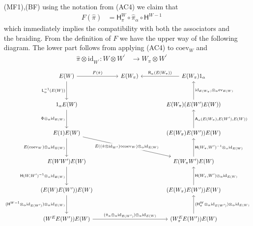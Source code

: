 \begin{prf}
\begin{enumerate}
\item[(MF1),(BF)]
using the notation from (AC4) we claim that
\begin{align*}
  F(\hat{\pi})
  &=
  \mathsf{H}_{\pi}^{W}
  \circ
  \hat{\pi}_{\alpha}
  \circ
  \mathsf{H}^{W -1}
\end{align*}
which immediately implies the compatibility with both the associators and the braiding.
\newpage
From the definition of $F$ we have the upper way of the following diagram. The lower part follows from applying (AC4) to $\mathrm{coev}_{W}$ and
\begin{align*}
  \hat{\pi} \otimes \mathrm{id}_{W^{\prime}}
  \colon
  W
  \otimes
  W^{\prime}
  &\to
  W_{\pi}
  \otimes
  W^{\prime}
\end{align*}
\begin{equation*}
\begin{tikzcd}[row sep=3.2em,column sep=4em]
  E(W)
  \ar{r}{F(\hat{\pi})}
  \ar{d}[swap]{\mathsf{L}_{\alpha}^{-1}(E(W))}
  &
  E(W_{\pi})
  &
  E(W_{\pi}) 1_{\alpha}
  \ar{l}[swap]{\mathsf{R}_{\alpha}(E(W_{\pi}))}
  \\
  1_{\alpha} E(W)
  \ar{d}[swap]{\Phi \otimes_{\alpha} \mathrm{id}_{E(W)}}
  &
  &
  E(W_{\pi}) (E(W^{\prime}) E(W))
  \ar{u}[swap]{\mathrm{id}_{E(W_{\pi})} \otimes_{\alpha} \mathrm{ev}_{E(W)}}
  \\
  E(1) E(W)
  \ar{rrd}[description]{E((\hat{\pi} \otimes \mathrm{id}_{W^{\prime}}) \circ \mathrm{coev}_{W}) \otimes_{\alpha} \mathrm{id}_{E(W)}}
  \ar{d}[swap]{E(\mathrm{coev}_{W}) \otimes_{\alpha} \mathrm{id}_{E(W)}}
  &
  &
  (E(W_{\pi}) E(W^{\prime})) E(W)
  \ar{u}[swap]{\mathsf{A}_{\alpha}(E(W_{\pi}),E(W^{\prime}),E(W))}
  \\
  E(W W^{\prime}) E(W)
  \ar{d}[swap]{\mathsf{H}(W,W^{\prime})^{-1} \otimes_{\alpha} \mathrm{id}_{E(W)}}
  &
  &
  E(W_{\pi} W^{\prime}) E(W)
  \ar{u}[swap]{\mathsf{H}(W_{\pi},W^{\prime})^{-1} \otimes_{\alpha} \mathrm{id}_{E(W)}}
  \\
  (E(W) E(W^{\prime})) E(W)
  \ar{d}[swap]{(\mathsf{H}^{W -1} \otimes_{\alpha} \mathrm{id}_{E(W^{\prime})}) \otimes_{\alpha} \mathrm{id}_{E(W)}}
  &
  &
  (E(W_{\pi}) E(W^{\prime})) E(W)
  \ar{u}[swap]{\mathsf{H}(W_{\pi},W^{\prime}) \otimes_{\alpha} \mathrm{id}_{E(W)}}
  \\
  (W^{E} E(W^{\prime})) E(W)
  \ar{rr}{(\hat{\pi}_{\alpha} \otimes_{\alpha} \mathrm{id}_{E(W^{\prime})}) \otimes_{\alpha} \mathrm{id}_{E(W)}}
  &
  &
  (W_{\pi}^{E} E(W^{\prime})) E(W)
  \ar{u}[swap]{(\mathsf{H}_{\pi}^{W} \otimes_{\alpha} \mathrm{id}_{E(W^{\prime})}) \otimes_{\alpha} \mathrm{id}_{E(W)}}

\end{tikzcd}
\end{equation*}
\end{enumerate}
\end{prf}
